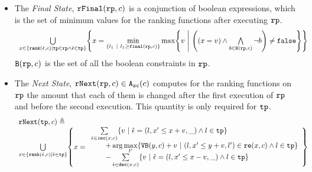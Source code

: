 \begin{defn}
\begin{itemize}
 \item  The \emph{Final State}, $\mathtt{rFinal}(\mathtt{rp}, c)$ is a conjunction of boolean expressions, which is the set of minimum values for the ranking functions
 after executing $\mathtt{rp}$.
 {\small
\[
  \begin{array}{l} 
   \bigcup\limits_{x \in \left\{ \locbound(\absevent, c) | \tpath \in \rprog \land \absevent \in \tpath \right\} }
   \left \{ 
   x = \min\limits_{ \left\{ l_1 ~|~ l_1 \geq \absfinal(\rprog, c) \right\} }
   \max\left\{
     v ~\middle\vert~ 
     \left( (x = v) \land \bigwedge\limits_{b \in \kw{B}(\rprog, c)} \neg b \right) \neq \efalse
   \right\}
   \right\}
  \end{array}
  \]
    }
    $\mathtt{B}(\mathtt{rp}, c)$ is the set of all the boolean constraints in $\mathtt{rp}$.
 \item The \emph{Next State}, $\mathtt{rNext}(\mathtt{rp}, c) \in {\ensuremath{\mathtt{A_{sc}}}}(c)$ 
 computes for the ranking functions on $\mathtt{rp}$ the amount that each of them is changed after the first execution of $\mathtt{rp}$ and before the second execution. This quantity is only required for $\mathtt{tp}$.
 {\small
 \[
   \begin{array}{l}
   \rfnext(\tpath, c) \triangleq 
   \\
   \bigcup\limits_{x \in \left\{ \locbound(\absevent, c) | \absevent \in \tpath \right\}}
   \left\{ x = \begin{array}{l}
  \sum\limits_{\absevent \in \inc(x, c) }
   \left\{ v ~\middle\vert~ \absevent = (l, x' \leq x + v, \_) \land l \in \tpath\right\}
   \\ \qquad 
   + \arg\max\limits_{l' }
      \left\{ \varinvar(y, c) + v ~\middle\vert~ (l, x' \leq y + v, l') \in \reset(x, c) \land l \in \tpath\right\}
      \\ \qquad 
     - \sum\limits_{ \absevent \in \dec(x, c) }\left\{ 
       v ~\middle\vert~ \absevent = (l, x' \leq x - v, \_) \land l \in \tpath 
       \right\}
     \end{array}
   \right\} 
   \end{array}
 \]
  }
\end{itemize}
\end{defn}
